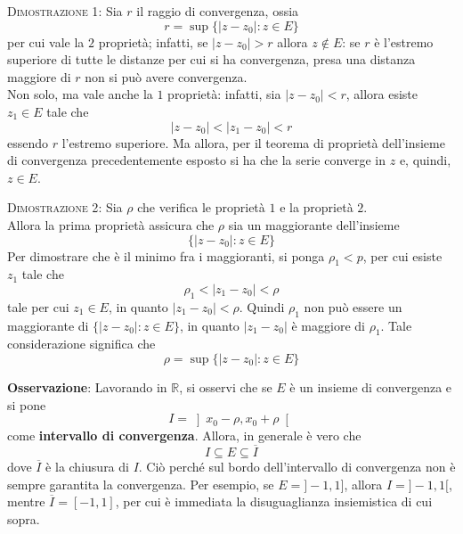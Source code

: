 \documentclass[a4paper]{extarticle}
\begin{document}
\vspace{2em}
\noindent
\normalfont \normalsize
\textsc{Dimostrazione 1}: Sia $r$ il raggio di convergenza, ossia
\[r = \sup \{\left \vert z - z_0 \right \vert : z \in E\}\]
per cui vale la $2$ proprietà; infatti, se $\left \vert z - z_0 \right \vert > r$ allora $z \notin E$: se $r$ è l'estremo superiore di tutte le distanze per cui si ha convergenza, presa una distanza maggiore di $r$ non si può avere convergenza.\\
Non solo, ma vale anche la $1$ proprietà: infatti, sia $\left \vert z - z_0 \right \vert < r$, allora esiste $z_1 \in E$ tale che
\[\left \vert z - z_0 \right \vert < \left \vert z_1 - z_0 \right \vert < r\]
essendo $r$ l'estremo superiore. Ma allora, per il teorema di proprietà dell'insieme di convergenza precedentemente esposto si ha che la serie converge in $z$ e, quindi, $z \in E$.

\vspace{2em}
\noindent
\normalfont \normalsize
\textsc{Dimostrazione 2}: Sia $\rho$ che verifica le proprietà $1$ e la proprietà $2$.\\
Allora la prima proprietà assicura che $\rho$ sia un maggiorante dell'insieme
\[\{\left \vert z - z_0 \right \vert : z \in E\}\]
Per dimostrare che è il minimo fra i maggioranti, si ponga $\rho_1 < p$, per cui esiste $z_1$ tale che
\[\rho_1 < \left \vert z_1 - z_0 \right \vert < \rho\]
tale per cui $z_1 \in E$, in quanto $\left \vert z_1 - z_0 \right \vert < \rho$. Quindi $\rho_1$ non può essere un maggiorante di $\{\left \vert z - z_0 \right \vert : z \in E\}$, in quanto $\left \vert z_1 - z_0 \right \vert$ è maggiore di $\rho_1$. Tale considerazione significa che
\[\rho = \sup \{\left \vert z - z_0 \right \vert : z \in E\}\]

\vspace{1em}
\noindent
\textbf{Osservazione}: Lavorando in $\mathbb{R}$, si osservi che se $E$ è un insieme di convergenza e si pone
\[I = \left ] x_0 - \rho, x_0 + \rho \right[\]
come \textbf{intervallo di convergenza}. Allora, in generale è vero che
\[I \subseteq E \subseteq \overline{I}\]
dove $\overline{I}$ è la chiusura di $I$. Ciò perché sul bordo dell'intervallo di convergenza non è sempre garantita la convergenza. Per esempio, se $E=]-1,1]$, allora $I=]-1,1[$, mentre $\overline{I}=[-1,1]$, per cui è immediata la disuguaglianza insiemistica di cui sopra.

\vspace{1em}
\end{document}
